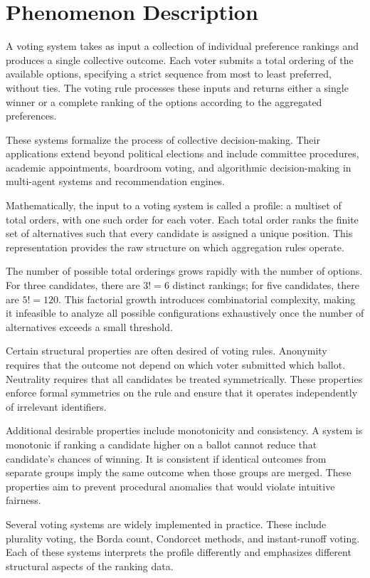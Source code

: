 \section*{Phenomenon Description}

A voting system takes as input a collection of individual preference rankings and produces a single collective outcome. Each voter submits a total ordering of the available options, specifying a strict sequence from most to least preferred, without ties. The voting rule processes these inputs and returns either a single winner or a complete ranking of the options according to the aggregated preferences.

These systems formalize the process of collective decision-making. Their applications extend beyond political elections and include committee procedures, academic appointments, boardroom voting, and algorithmic decision-making in multi-agent systems and recommendation engines.

Mathematically, the input to a voting system is called a profile: a multiset of total orders, with one such order for each voter. Each total order ranks the finite set of alternatives such that every candidate is assigned a unique position. This representation provides the raw structure on which aggregation rules operate.

The number of possible total orderings grows rapidly with the number of options. For three candidates, there are $3! = 6$ distinct rankings; for five candidates, there are $5! = 120$. This factorial growth introduces combinatorial complexity, making it infeasible to analyze all possible configurations exhaustively once the number of alternatives exceeds a small threshold.

Certain structural properties are often desired of voting rules. Anonymity requires that the outcome not depend on which voter submitted which ballot. Neutrality requires that all candidates be treated symmetrically. These properties enforce formal symmetries on the rule and ensure that it operates independently of irrelevant identifiers.

Additional desirable properties include monotonicity and consistency. A system is monotonic if ranking a candidate higher on a ballot cannot reduce that candidate’s chances of winning. It is consistent if identical outcomes from separate groups imply the same outcome when those groups are merged. These properties aim to prevent procedural anomalies that would violate intuitive fairness.

Several voting systems are widely implemented in practice. These include plurality voting, the Borda count, Condorcet methods, and instant-runoff voting. Each of these systems interprets the profile differently and emphasizes different structural aspects of the ranking data.

